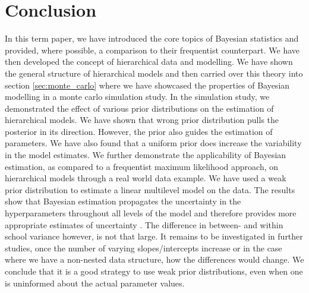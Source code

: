 \section{Conclusion}
In this term paper, we have introduced the core topics of Bayesian statistics and provided, where possible, a comparison to their frequentist counterpart. We have then developed the concept of hierarchical data and modelling. We have shown the general structure of hierarchical  models and then carried over this theory into section \ref{sec:monte_carlo} where we have showcased the properties of Bayesian modelling in a monte carlo simulation study. In the simulation study, we demonstrated the effect of various prior distributions on the estimation of hierarchical models. We have shown that wrong prior distribution pulls the posterior in its direction. However, the prior also guides the estimation of parameters. We have also found that a uniform prior does increase the variability in the model estimates. 
We further demonstrate the applicability of Bayesian estimation, as compared to a frequentist maximum likelihood approach, on hierarchical models through a real world data example. We have used a weak prior distribution to estimate a linear multilevel model on the data.  The results show that Bayesian estimation propagates the uncertainty in the hyperparameters throughout all levels of the model and therefore provides more appropriate estimates of uncertainty \cite{browne2006comparison}. The difference in between- and within school variance however, is not that large. It remains to be investigated in further studies, once the number of varying slopes/intercepts increase or in the case where we have a non-nested data structure,  how the differences would change. We conclude that it is a good strategy to use weak prior distributions, even when one is uninformed about the actual parameter values. 
